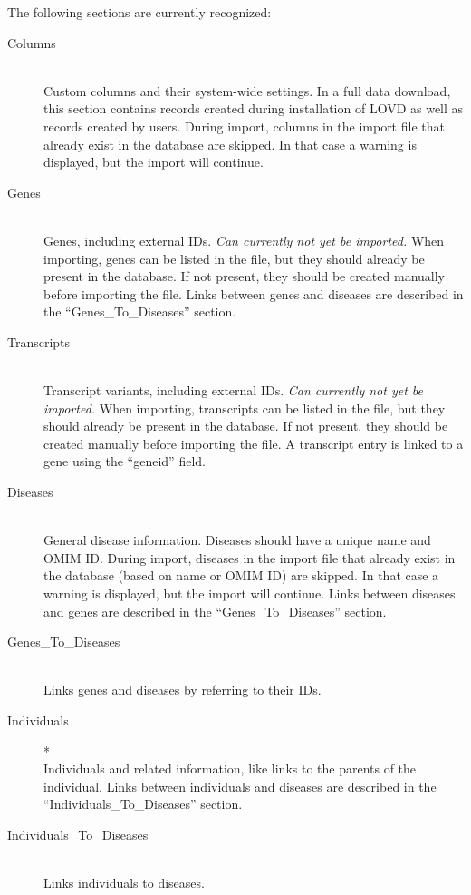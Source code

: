 \noindent
The following sections are currently recognized:
\begin{description}
  \item[Columns] \hfill \\
    Custom columns and their system-wide settings.
    In a full data download, this section contains records created during
     installation of LOVD as well as records created by users.
    During import, columns in the import file that already exist in the database are skipped.
    In that case a warning is displayed, but the import will continue.
  \item[Genes] \hfill \\
    Genes, including external IDs. \emph{Can currently not yet be imported.}
    When importing, genes can be listed in the file, but they should already be present in the database.
    If not present, they should be created manually before importing the file.
    Links between genes and diseases are described in the ``Genes\_To\_Diseases'' section.
  \item[Transcripts] \hfill \\
    Transcript variants, including external IDs. \emph{Can currently not yet be imported.}
    When importing, transcripts can be listed in the file, but they should already be present in the database.
    If not present, they should be created manually before importing the file.
    A transcript entry is linked to a gene using the ``geneid'' field.
  \item[Diseases] \hfill \\
    General disease information.
    Diseases should have a unique name and OMIM ID.
    During import, diseases in the import file that already exist in the database
     (based on name or OMIM ID) are skipped.
    In that case a warning is displayed, but the import will continue.
    Links between diseases and genes are described in the ``Genes\_To\_Diseases'' section.
  \item[Genes\_To\_Diseases] \hfill \\
    Links genes and diseases by referring to their IDs.
  \item[Individuals]* \hfill \\
    Individuals and related information, like links to the parents of the individual.
    Links between individuals and diseases are described in the ``Individuals\_To\_Diseases'' section.
  \item[Individuals\_To\_Diseases] \hfill \\
    Links individuals to diseases.

\end{description}
